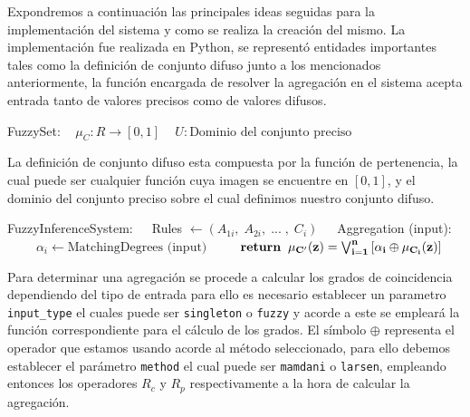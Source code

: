 \documentclass[a4paper,10pt,twocolumn]{article}
\begin{document}
Expondremos a continuaci\'on las principales ideas seguidas para la implementaci\'on del sistema y como se realiza la creaci\'on del mismo. La implementaci\'on fue realizada en Python, se represent\'o entidades importantes tales como la definici\'on de conjunto difuso junto a los mencionados anteriormente, la funci\'on encargada de resolver la agregaci\'on en el sistema acepta entrada tanto de valores precisos como de valores difusos.

\begin{algorithm}
	\begin{algorithmic}
		\STATE FuzzySet:
		\STATE $ \;\;\; \mu_{C}: R \rightarrow [0,1] $
		\STATE $ \;\;\; U: \text{Dominio del conjunto preciso}$
	\end{algorithmic}
\end{algorithm}

La definici\'on de conjunto difuso esta compuesta por la funci\'on de pertenencia, la cual puede ser cualquier funci\'on cuya imagen se encuentre en $[0,1]$, y el dominio del conjunto preciso sobre el cual definimos nuestro conjunto difuso.

\begin{algorithm}
	\begin{algorithmic}
		\STATE FuzzyInferenceSystem:
		\STATE $\;\;\; $ Rules $ \leftarrow (A_{1i}, \;A_{2i},\; ...\;, \;C_i)$
		\STATE $ \;\;\;$ Aggregation (input): 
		\STATE $ \qquad\; \alpha_i \leftarrow \text{MatchingDegrees (input)}$
		\STATE $ \qquad\; \bf{return} \;\; \mu_{C'} (z) = \bigvee_{i=1}^{n} \left[ \alpha_i \oplus \mu_{C_i} (z) \right]$
	\end{algorithmic}
\end{algorithm}

Para determinar una agregaci\'on se procede a calcular los grados de coincidencia dependiendo del tipo de entrada para ello es necesario establecer un parametro \verb|input_type| el cuales puede ser \verb|singleton| o \verb|fuzzy| y acorde a este se emplear\'a la funci\'on correspondiente para el c\'alculo de los grados. El s\'imbolo $\oplus$ representa el operador que estamos usando acorde al m\'etodo seleccionado, para ello debemos establecer el par\'ametro \verb|method| el cual puede ser \verb|mamdani| o \verb|larsen|, empleando entonces los operadores $R_c$ y $R_p$ respectivamente a la hora de calcular la agregaci\'on.
\end{document}
